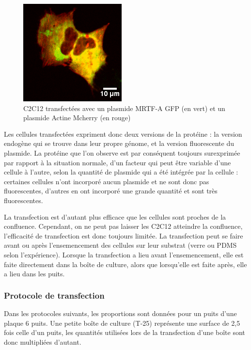 \documentclass{report}
\begin{document}
	\begin{figure}
	\includegraphics[scale=0.75]{C2C12_RGB-1.png}
	\caption{C2C12 transfectées avec un plasmide MRTF-A GFP (en vert) et un plasmide Actine Mcherry (en rouge)}
	\end{figure}
	
	Les cellules transfectées expriment donc deux versions de la protéine : la version endogène qui se trouve dans leur propre génome, et la version fluorescente du plasmide. La protéine que l'on observe est par conséquent toujours surexprimée par rapport à la situation normale, d'un facteur qui peut être variable d'une cellule à l'autre, selon la quantité de plasmide qui a été intégrée par la cellule : certaines cellules n'ont incorporé aucun plasmide et ne sont donc pas fluorescentes, d'autres en ont incorporé une grande quantité et sont très fluorescentes. 
	
	La transfection est d'autant plus efficace que les cellules sont proches de la confluence. Cependant, on ne peut pas laisser les C2C12 atteindre la confluence, l'efficacité de transfection est donc toujours limitée. La transfection peut se faire avant ou après l'ensemencement des cellules sur leur substrat (verre ou PDMS selon l'expérience). Lorsque la transfection a lieu avant l'ensemencement, elle est faite directement dans la boîte de culture, alors que lorsqu'elle est faite après, elle a lieu dans les puits. 
	
	 
	
	\subsubsection{Protocole de transfection}
	
	Dans les protocoles suivants, les proportions sont données pour un puits d'une plaque 6 puits. Une petite boîte de culture (T-25) représente une surface de 2,5 fois celle d'un puits, les quantités utilisées lors de la transfection d'une boîte sont donc multipliées d'autant.
	
\end{document}
